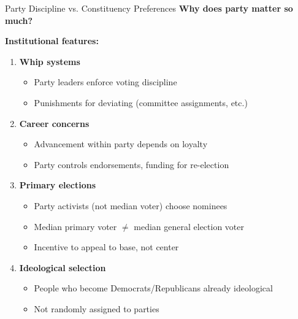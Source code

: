 \documentclass[10pt]{beamer}
\begin{document}
\begin{frame}{Party Discipline vs. Constituency Preferences}
\textbf{Why does party matter so much?}



\textbf{Institutional features:}
\begin{enumerate}
\item \textbf{Whip systems}
\begin{itemize}
\item Party leaders enforce voting discipline
\item Punishments for deviating (committee assignments, etc.)
\end{itemize}


\item \textbf{Career concerns}
\begin{itemize}
\item Advancement within party depends on loyalty
\item Party controls endorsements, funding for re-election
\end{itemize}


\item \textbf{Primary elections}
\begin{itemize}
\item Party activists (not median voter) choose nominees
\item Median primary voter $\neq$ median general election voter
\item Incentive to appeal to base, not center
\end{itemize}


\item \textbf{Ideological selection}
\begin{itemize}
\item People who become Democrats/Republicans already ideological
\item Not randomly assigned to parties
\end{itemize}
\end{enumerate}
\end{frame}
\end{document}
